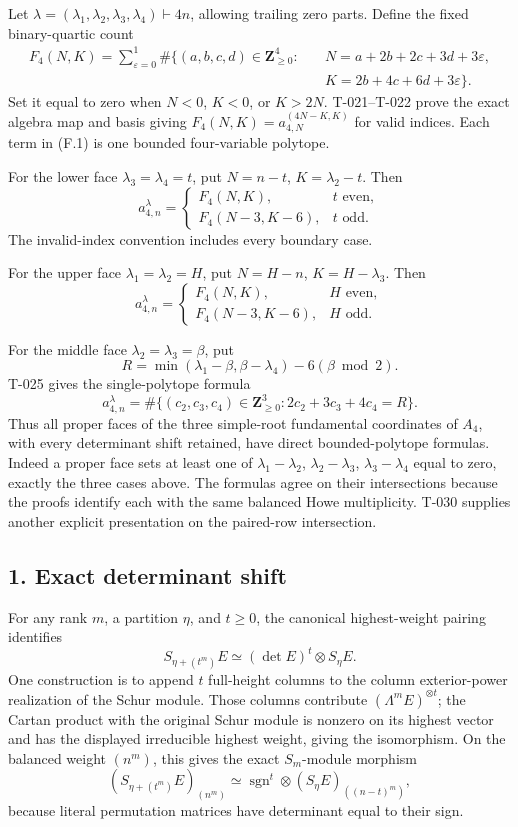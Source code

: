 \documentclass[
  10pt,
]{article}
\begin{document}
Let \(\lambda=(\lambda_1,\lambda_2,\lambda_3,\lambda_4)\vdash4n\),
allowing trailing zero parts. Define the fixed binary-quartic count \[
\begin{aligned}
F_4(N,K)=\sum_{\varepsilon=0}^1\#\{(a,b,c,d)\in\mathbf Z_{\ge0}^4:\quad
&N=a+2b+2c+3d+3\varepsilon,\\
&K=2b+4c+6d+3\varepsilon\}.
\end{aligned}
\tag{F.1}
\] Set it equal to zero when \(N<0\), \(K<0\), or \(K>2N\). T-021--T-022
prove the exact algebra map and basis giving
\(F_4(N,K)=a_{4,N}^{(4N-K,K)}\) for valid indices. Each term in (F.1) is
one bounded four-variable polytope.

For the lower face \(\lambda_3=\lambda_4=t\), put \(N=n-t\),
\(K=\lambda_2-t\). Then \[
\boxed{
a_{4,n}^{\lambda}=
\begin{cases}
F_4(N,K),&t\text{ even},\\
F_4(N-3,K-6),&t\text{ odd}.
\end{cases}}
\tag{F.2}
\] The invalid-index convention includes every boundary case.

For the upper face \(\lambda_1=\lambda_2=H\), put \(N=H-n\),
\(K=H-\lambda_3\). Then \[
\boxed{
a_{4,n}^{\lambda}=
\begin{cases}
F_4(N,K),&H\text{ even},\\
F_4(N-3,K-6),&H\text{ odd}.
\end{cases}}
\tag{F.3}
\]

For the middle face \(\lambda_2=\lambda_3=\beta\), put \[
R=\min(\lambda_1-\beta,\beta-\lambda_4)-6(\beta\bmod2).
\] T-025 gives the single-polytope formula \[
\boxed{a_{4,n}^{\lambda}
=\#\{(c_2,c_3,c_4)\in\mathbf Z_{\ge0}^3:
2c_2+3c_3+4c_4=R\}.}
\tag{F.4}
\] Thus all proper faces of the three simple-root fundamental
coordinates of \(A_4\), with every determinant shift retained, have
direct bounded-polytope formulas. Indeed a proper face sets at least one
of \(\lambda_1-\lambda_2\), \(\lambda_2-\lambda_3\),
\(\lambda_3-\lambda_4\) equal to zero, exactly the three cases above.
The formulas agree on their intersections because the proofs identify
each with the same balanced Howe multiplicity. T-030 supplies another
explicit presentation on the paired-row intersection.

\subsection{1. Exact determinant shift}\label{exact-determinant-shift}

For any rank \(m\), a partition \(\eta\), and \(t\ge0\), the canonical
highest-weight pairing identifies \[
S_{\eta+(t^m)}E\simeq(\det E)^t\otimes S_\eta E.
\tag{F.5}
\] One construction is to append \(t\) full-height columns to the column
exterior-power realization of the Schur module. Those columns contribute
\((\Lambda^mE)^{\otimes t}\); the Cartan product with the original Schur
module is nonzero on its highest vector and has the displayed
irreducible highest weight, giving the isomorphism. On the balanced
weight \((n^m)\), this gives the exact \(S_m\)-module morphism \[
(S_{\eta+(t^m)}E)_{(n^m)}
\simeq\operatorname{sgn}^{t}\otimes
(S_\eta E)_{((n-t)^m)},
\tag{F.6}
\] because literal permutation matrices have determinant equal to their
sign.
\end{document}
